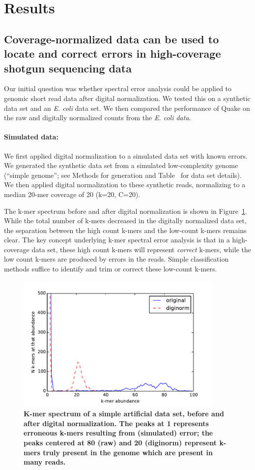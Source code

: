 \documentclass{article}
\begin{document}
\section{Results}

\subsection{Coverage-normalized data can be used to locate
and correct errors in high-coverage shotgun sequencing data}

Our initial question was whether spectral error analysis could be
applied to genomic short read data after digital normalization.  We
tested this on a synthetic data set and an {\em E. coli} data set.  We
then compared the performance of Quake on the raw and digitally
normalized counts from the {\em E. coli data}.

\paragraph{Simulated data:}
We first applied digital normalization to a simulated data set with
known errors.  We generated the synthetic data set from a simulated
low-complexity genome (``simple genome''; see Methods for generation
and Table~\label{tab:data} for data set details). We then applied
digital normalization to these synthetic reads, normalizing to a
median 20-mer coverage of 20 (k=20, C=20).

The k-mer spectrum before and after digital normalization is shown in
Figure~\ref{fig:spectrum}.  While the total number of k-mers decreased
in the digitally normalized data set, the separation between the high
count k-mers and the low-count k-mers remains clear.  The key concept
underlying k-mer spectral error analysis is that in a high-coverage
data set, these high count k-mers will represent {\em correct} k-mers,
while the low count k-mers are produced by errors in the reads.
Simple classification methods suffice to identify and trim or correct
these low-count k-mers.

\begin{figure}[!ht]
 \centerline{\includegraphics[width=4in]{./figures/kmer-spectrum}}
\caption{\bf K-mer spectrum of a simple artificial data set, before and after digital normalization.  The peaks at 1 represents erroneous k-mers resulting
from (simulated) error; the peaks centered at 80 (raw) and 20 (diginorm)
represent k-mers truly present in the genome which are present in many reads.}
\label{fig:spectrum}
\end{figure}
\end{document}
